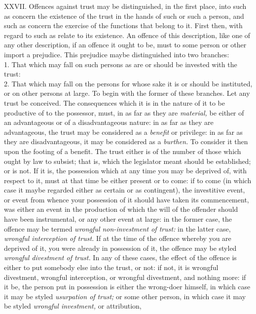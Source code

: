 \documentclass[12pt]{report}
\begin{document}
XXVII. Offences against trust may be distinguished, in the first place,
into such as concern the existence of the trust in the hands of such or
such a person, and such as concern the exercise of the functions that
belong to it. First then, with regard to such as relate to its
existence. An offence of this description, like one of any other
description, if an offence it ought to be, must to some person or other
import a prejudice. This prejudice maybe distinguished into two
branches:\\
1. That which may fall on such persons as are or should be invested with
the trust:\\
2. That which may fall on the persons for whose sake it is or should be
instituted, or on other persons at large. To begin with the former of
these branches. Let any trust be conceived. The consequences which it is
in the nature of it to be productive of to the possessor, must, in as
far as they are \emph{material,} be either of an advantageous or of a
disadvantageous nature: in as far as they are advantageous, the trust
may be considered as a \emph{benefit} or privilege: in as far as they
are disadvantageous, it may be considered as a \emph{burthen.} To
consider it then upon the footing of a benefit. The trust either is of
the number of those which ought by law to subsist; that is, which the
legislator meant should be established; or is not. If it is, the
possession which at any time you may be deprived of, with respect to it,
must at that time be either present or to come: if to come (in which
case it maybe regarded either as certain or as contingent), the
investitive event, or event from whence your possession of it should
have taken its commencement, was either an event in the production of
which the will of the offender should have been instrumental, or any
other event at large: in the former case, the offence may be termed
\emph{wrongful non-investment of trust:} in the latter case,
\emph{wrongful interception of trust.} If at the time of the offence
whereby you are deprived of it, you were already in possession of it,
the offence may be styled \emph{wrongful divestment of trust.} In any of
these cases, the effect of the offence is either to put somebody else
into the trust, or not: if not, it is wrongful divestment, wrongful
interception, or wrongful divestment, and nothing more: if it be, the
person put in possession is either the wrong-doer himself, in which case
it may be styled \emph{usurpation of trust;} or some other person, in
which case it may be styled \emph{wrongful investment,} or attribution,
\end{document}
